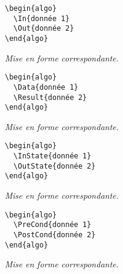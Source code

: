 \documentclass[12pt,a4paper]{article}
\theoremstyle{definition}
\newenvironment{frame-gene}[1][]{
	\begin{tcolorbox}[
		title        = #1, 
		colbacktitle = black!10!white, 
		colback      = white, 
		coltitle     = black,
		fonttitle    = \bfseries\itshape\small, 
		breakable,
		center title]
}{
	\end{tcolorbox}
}
\begin{document}
\begin{multicols}{2}
    \centering
    \begin{frame-gene}
\begin{verbatim}
\begin{algo}
  \In{donnée 1}
  \Out{donnée 2}
\end{algo}
\end{verbatim}
    \end{frame-gene}
    \vfill\null
    \columnbreak
    \textit{Mise en forme correspondante.}
\begin{algo}
\end{algo}
    \vfill\null
\end{multicols}


\begin{multicols}{2}
    \centering
    \begin{frame-gene}
\begin{verbatim}
\begin{algo}
  \Data{donnée 1}
  \Result{donnée 2}
\end{algo}
\end{verbatim}
    \end{frame-gene}
    \vfill\null
    \columnbreak
    \textit{Mise en forme correspondante.}
\begin{algo}
\end{algo}
    \vfill\null
\end{multicols}


\begin{multicols}{2}
    \centering
    \begin{frame-gene}
\begin{verbatim}
\begin{algo}
  \InState{donnée 1}
  \OutState{donnée 2}
\end{algo}
\end{verbatim}
    \end{frame-gene}
    \vfill\null
    \columnbreak
    \textit{Mise en forme correspondante.}
\begin{algo}
\end{algo}
    \vfill\null
\end{multicols}


\begin{multicols}{2}
    \centering
    \begin{frame-gene}
\begin{verbatim}
\begin{algo}
  \PreCond{donnée 1}
  \PostCond{donnée 2}
\end{algo}
\end{verbatim}
    \end{frame-gene}
    \vfill\null
    \columnbreak
    \textit{Mise en forme correspondante.}
\begin{algo}
\end{algo}
    \vfill\null
\end{multicols}
\end{document}

